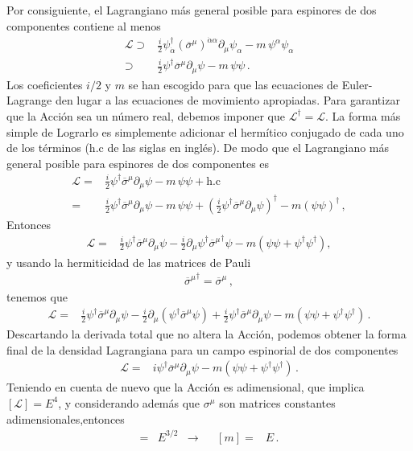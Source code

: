 \begin{frame}
Por consiguiente, el Lagrangiano más general posible para espinores de dos componentes contiene al menos
\begin{align}
    \mathcal{L}\supset&\frac{i}{2}{\psi}^{\dagger}_{\dot{\alpha}}\left(\overline{\sigma}^{\mu}\right)^{\dot{\alpha}\alpha}\partial_\mu\psi_{\alpha}-m\,\psi^{\alpha}\psi_{\alpha} \nonumber\\
\supset&\frac{i}{2}{\psi}^{\dagger}\overline{\sigma}^\mu\partial_\mu\psi-m\,\psi\psi\,.
\end{align}
Los coeficientes $i/2$ y $m$ se han escogido para que las ecuaciones de Euler-Lagrange den lugar a las ecuaciones de movimiento apropiadas.
Para garantizar que la Acción sea un número real, debemos imponer que  $\mathcal{L}^{\dagger}=\mathcal{L}$. La forma más simple de Lograrlo es simplemente adicionar el hermítico conjugado de cada uno de los términos (h.c de las siglas en inglés). De modo que el Lagrangiano más general posible para espinores de dos componentes es
\begin{align*}
  \mathcal{L}=&\frac{i}{2}{\psi}^{\dagger}\overline{\sigma}^\mu\partial_\mu\psi-m\,\psi\psi+
\text{h.c} \nonumber\\
=&\frac{i}{2}{\psi}^{\dagger}\overline{\sigma}^\mu\partial_\mu\psi-m\,\psi\psi+
\left(\frac{i}{2} {\psi}^{\dagger}\overline{\sigma}^\mu\partial_\mu\psi \right)^{\dagger}-m \left(\psi\psi  \right)^{\dagger}\,,
\end{align*}
Entonces
\begin{align*}
  \mathcal{L}=&\frac{i}{2}{\psi}^{\dagger}\overline{\sigma}^\mu\partial_\mu\psi-\frac{i}{2} \partial_\mu\psi^{\dagger}{\overline{\sigma}^\mu}^{\dagger}\psi-m \left( \psi\psi+\psi^{\dagger}\psi^{\dagger} \right),
\end{align*}
y usando la hermiticidad de las matrices de Pauli
\begin{align}
{\overline{\sigma}^\mu}^{\dagger}=\overline{\sigma}^\mu\,,
\end{align}
tenemos que
\begin{align}
\mathcal{L}=&\frac{i}{2}{\psi}^{\dagger}\overline{\sigma}^\mu\partial_\mu\psi-\frac{i}{2} \partial_\mu \left(  \psi^{\dagger} \overline{\sigma}^\mu\psi\right)
+\frac{i}{2}{\psi}^{\dagger}\overline{\sigma}^\mu\partial_\mu\psi
-m \left( \psi\psi+\psi^{\dagger}\psi^{\dagger} \right)\,.
\end{align}
Descartando la derivada total que no altera la Acción, podemos obtener la forma final de la densidad Lagrangiana para un campo espinorial de dos componentes
\begin{align}
  \mathcal{L}=&i{\psi}^{\dagger}\overline{\sigma}^\mu\partial_\mu\psi-
m \left( \psi\psi+\psi^{\dagger}\psi^{\dagger} \right)\,.
\end{align}
Teniendo en cuenta de nuevo que la Acción es adimensional, que implica $[\mathcal{L}]=E^4$, y considerando además que $\sigma^{\mu}$ son matrices constantes adimensionales,entonces
\begin{align*}
  [\psi]=&E^{3/2}&\to&& [m]=&E\,.
\end{align*}




\end{frame}
